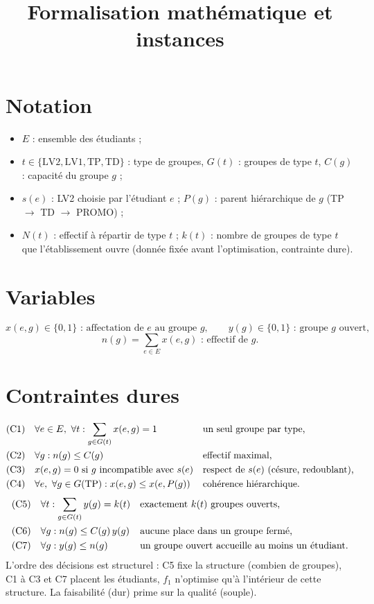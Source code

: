 \documentclass[11pt,a4paper]{article}
\title{\textbf{Formalisation mathématique et instances}}
\author{}
\date{}
\begin{document}
\maketitle

\section{Notation}
\begin{itemize}[leftmargin=*,itemsep=2pt,label={\textbullet}]
  \item $E$ : ensemble des étudiants ;
  \item $t \in \{\mathrm{LV2}, \mathrm{LV1}, \mathrm{TP}, \mathrm{TD}\}$ : type de groupes, $G(t)$ : groupes de type $t$, $C(g)$ : capacité du groupe $g$ ;
  \item $s(e)$ : LV2 choisie par l'étudiant $e$ ; $P(g)$ : parent hiérarchique de $g$ (TP $\to$ TD $\to$ PROMO) ;
  \item $N(t)$ : effectif à répartir de type $t$ ; $k(t)$ : nombre de groupes de type $t$ que l'établissement ouvre (donnée fixée avant l'optimisation, contrainte dure).
\end{itemize}

\section{Variables}
\[
x(e,g) \in \{0,1\} \text{ : affectation de } e \text{ au groupe } g,
\qquad
y(g) \in \{0,1\} \text{ : groupe } g \text{ ouvert},
\]
\[
n(g) = \sum_{e \in E} x(e,g) \text{ : effectif de } g.
\]

\section{Contraintes dures}
\begin{align}
  &\text{(C1)} \quad \forall e \in E,\ \forall t : \sum_{g \in G(t)} x(e,g) = 1
    &&\text{un seul groupe par type,}\notag\\
  &\text{(C2)} \quad \forall g : n(g) \le C(g)
    &&\text{effectif maximal,}\notag\\
  &\text{(C3)} \quad x(e,g) = 0 \ \text{si } g \text{ incompatible avec } s(e)
    &&\text{respect de } s(e)\text{ (césure, redoublant),}\notag\\
  &\text{(C4)} \quad \forall e,\ \forall g \in G(\mathrm{TP}) : x(e,g) \le x(e, P(g))
    &&\text{cohérence hiérarchique.}\notag
\end{align}
\begin{align}
  &\text{(C5)} \quad \forall t : \sum_{g \in G(t)} y(g) = k(t)
    &&\text{exactement $k(t)$ groupes ouverts,}\notag\\
  &\text{(C6)} \quad \forall g : n(g) \le C(g)\, y(g)
    &&\text{aucune place dans un groupe fermé,}\notag\\
  &\text{(C7)} \quad \forall g : y(g) \le n(g)
    &&\text{un groupe ouvert accueille au moins un étudiant.}\notag
\end{align}
L'ordre des décisions est structurel : C5 fixe la structure (combien de groupes), C1 à C3 et C7 placent les étudiants, $f_1$ n'optimise qu'à l'intérieur de cette structure. La faisabilité (dur) prime sur la qualité (souple).
\end{document}
